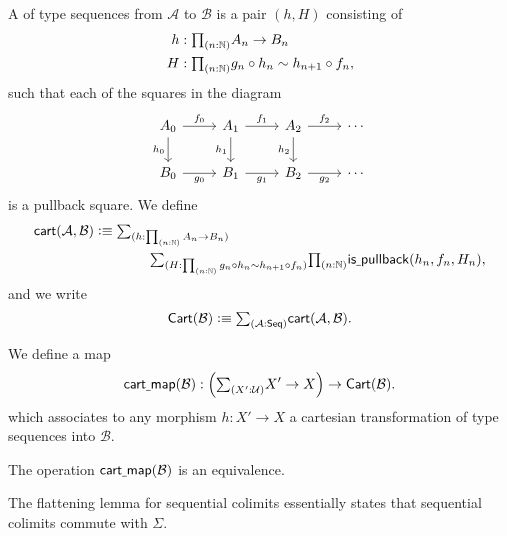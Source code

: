 \begin{defn}
A  of type sequences from $\mathcal{A}$ to $\mathcal{B}$ is a pair $(h,H)$ consisting of
\begin{align*}
h & : \prd{n:\N} A_n\to B_n \\
H & : \prd{n:\N} g_n\circ h_n \htpy h_{n+1}\circ f_n,
\end{align*}
such that each of the squares in the diagram
\begin{equation*}
\begin{tikzcd}
A_0 \arrow[d,swap,"h_0"] \arrow[r,"f_0"] & A_1 \arrow[d,swap,"h_1"] \arrow[r,"f_1"] & A_2 \arrow[d,swap,"h_2"] \arrow[r,"f_2"] & \cdots \\
B_0 \arrow[r,swap,"g_0"] & B_1 \arrow[r,swap,"g_1"] & B_2 \arrow[r,swap,"g_2"] & \cdots
\end{tikzcd}
\end{equation*}
is a pullback square. We define
\begin{align*}
\mathsf{cart}(\mathcal{A},\mathcal{B}) & \defeq\sm{h:\prd{n:\N}A_n\to B_n} \\
& \qquad\qquad \sm{H:\prd{n:\N}g_n\circ h_n\htpy h_{n+1}\circ f_n}\prd{n:\N}\mathsf{is\usc{}pullback}(h_n,f_n,H_n),
\end{align*}
and we write
\begin{equation*}
\mathsf{Cart}(\mathcal{B}) \defeq \sm{\mathcal{A}:\mathsf{Seq}}\mathsf{cart}(\mathcal{A},\mathcal{B}).
\end{equation*}
\end{defn}

\begin{defn}
We define a map
\begin{equation*}
\mathsf{cart\usc{}map}(\mathcal{B}) : \Big(\sm{X':\UU}X'\to X\Big)\to\mathsf{Cart}(\mathcal{B}).
\end{equation*}
which associates to any morphism $h:X'\to X$ a cartesian transformation of type sequences into $\mathcal{B}$.
\end{defn}

\begin{thm}
The operation $\mathsf{cart\underline{\ }{}map}(\mathcal{B})$ is an equivalence.
\end{thm}

The flattening lemma for sequential colimits essentially states that sequential colimits commute with $\Sigma$. 

